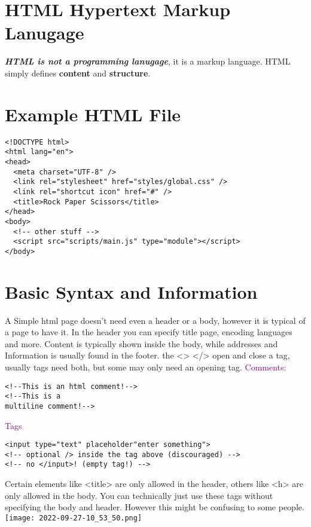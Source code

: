 \documentclass[main.tex,fontsize=6pt,paper=a4,paper=landscape,DIV=calc,]{scrartcl}
\begin{document}
\begin{multicols*}{4}
\section{HTML Hypertext Markup Lanugage}

\textbf{\emph{HTML is not a programming lanugage}}, it is a markup language.\newline
HTML simply defines \textbf{content} and \textbf{structure}.

\section{Example HTML File}
\vspace{-2mm}
\begin{lstlisting}
<!DOCTYPE html>
<html lang="en">
<head>
  <meta charset="UTF-8" />
  <link rel="stylesheet" href="styles/global.css" />
  <link rel="shortcut icon" href="#" />
  <title>Rock Paper Scissors</title>
</head>
<body>
  <!-- other stuff -->
  <script src="scripts/main.js" type="module"></script>
</body>
\end{lstlisting}
\vspace{2mm}

\section{Basic Syntax and Information}
A Simple html page doesn't need even a header or a body, however it is typical of a page to have it.\newline
In the header you can specify title page, encoding languages and more.\newline
Content is typically shown inside the body, while addresses and Information is usually found in the footer.\newline
the <> </> open and close a tag, usually tags need both, but some may only need an opening tag.\newline
\textcolor{purple}{Comments:}
\vspace{-2mm}
\begin{lstlisting}
<!--This is an html comment!-->
<!--This is a 
multiline comment!-->
\end{lstlisting}
\vspace{2mm}

\textcolor{purple}{Tags}
\vspace{-2mm}
\begin{lstlisting}
<input type="text" placeholder"enter something">
<!-- optional /> inside the tag above (discouraged) -->
<!-- no </input>! (empty tag!) -->
\end{lstlisting}
\vspace{2mm}
Certain elements like <title> are only allowed in the header, others like <h> are only allowed in the body.\newline
You can technically just use these tags without specifying the body and header.\newline
However this might be confusing to some people.
\texttt{[image: 2022-09-27-10\_53\_50.png]}



\end{multicols*}
\end{document}
